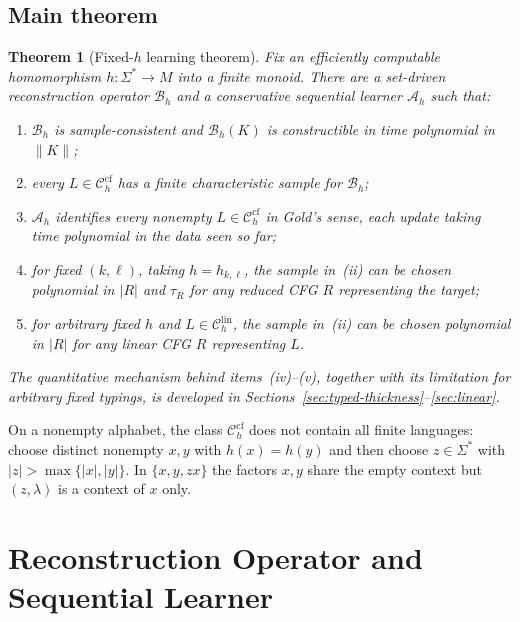 \documentclass[11pt,a4paper]{article}
\newtheorem{theorem}{Theorem}[section]
\theoremstyle{remark}
\theoremstyle{plain}
\newcommand{\cf}{\mathrm{cf}}
\newcommand{\lin}{\mathrm{lin}}
\newcommand{\Ccf}[1]{\mathcal C_{#1}^{\cf}}
\newcommand{\Clin}[1]{\mathcal C_{#1}^{\lin}}
\begin{document}
\subsection{Main theorem}

\begin{theorem}[Fixed-$h$ learning theorem]\label{thm:main}
Fix an efficiently computable homomorphism $h:\Sigma^*\to M$ into a finite
monoid.  There are a set-driven reconstruction operator $\mathcal B_h$ and a
conservative sequential learner $\mathcal A_h$ such that:
\begin{enumerate}[label=\textup{(\roman*)},nosep]
\item $\mathcal B_h$ is sample-consistent and $\mathcal B_h(K)$ is
constructible in time polynomial in $\|K\|$;
\item every $L\in\Ccf{h}$ has a finite characteristic sample for
$\mathcal B_h$;
\item $\mathcal A_h$ identifies every nonempty $L\in\Ccf{h}$ in Gold's
sense, each update taking time polynomial in the data seen so far;
\item for fixed $(k,\ell)$, taking $h=h_{k,\ell}$, the sample in~(ii) can
be chosen polynomial in $|R|$ and $\tau_R$ for any reduced CFG $R$
representing the target;
\item for arbitrary fixed $h$ and $L\in\Clin{h}$, the sample in~(ii) can
be chosen polynomial in $|R|$ for any linear CFG $R$ representing $L$.
\end{enumerate}
The quantitative mechanism behind items~(iv)--(v), together with its
limitation for arbitrary fixed typings, is developed in
Sections~\ref{sec:typed-thickness}--\ref{sec:linear}.
\end{theorem}

On a nonempty alphabet, the class $\Ccf{h}$ does not contain all finite
languages: choose distinct nonempty $x,y$ with $h(x)=h(y)$ and then choose
$z\in\Sigma^*$ with $|z|>\max\{|x|,|y|\}$.  In $\{x,y,zx\}$ the
factors $x,y$ share the empty context but $(z,\lambda)$ is a context of
$x$ only.

\section{Reconstruction Operator and Sequential Learner}
\label{sec:algo}
\end{document}
